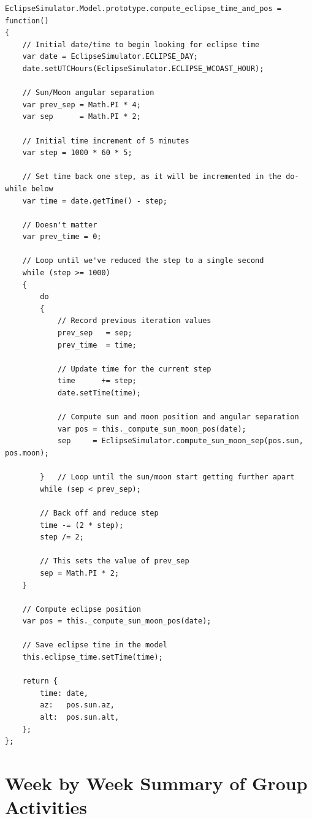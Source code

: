 \documentclass[10pt, onecolumn, draftclsnofoot, letterpaper, compsoc]{IEEEtran}
\begin{document}
\begin{verbatim}
EclipseSimulator.Model.prototype.compute_eclipse_time_and_pos = function()
{
    // Initial date/time to begin looking for eclipse time
    var date = EclipseSimulator.ECLIPSE_DAY;
    date.setUTCHours(EclipseSimulator.ECLIPSE_WCOAST_HOUR);

    // Sun/Moon angular separation
    var prev_sep = Math.PI * 4;
    var sep      = Math.PI * 2;

    // Initial time increment of 5 minutes
    var step = 1000 * 60 * 5;

    // Set time back one step, as it will be incremented in the do-while below
    var time = date.getTime() - step;

    // Doesn't matter
    var prev_time = 0;

    // Loop until we've reduced the step to a single second
    while (step >= 1000)
    {
        do
        {
            // Record previous iteration values
            prev_sep   = sep;
            prev_time  = time;

            // Update time for the current step
            time      += step;
            date.setTime(time);

            // Compute sun and moon position and angular separation
            var pos = this._compute_sun_moon_pos(date);
            sep     = EclipseSimulator.compute_sun_moon_sep(pos.sun, pos.moon);

        }	// Loop until the sun/moon start getting further apart
        while (sep < prev_sep);

        // Back off and reduce step
        time -= (2 * step);
        step /= 2;

        // This sets the value of prev_sep
        sep = Math.PI * 2;
    }

    // Compute eclipse position
    var pos = this._compute_sun_moon_pos(date);

    // Save eclipse time in the model
    this.eclipse_time.setTime(time);

    return {
        time: date,
        az:   pos.sun.az,
        alt:  pos.sun.alt,
    };
};
\end{verbatim}

\section{Week by Week Summary of Group Activities}
\end{document}
